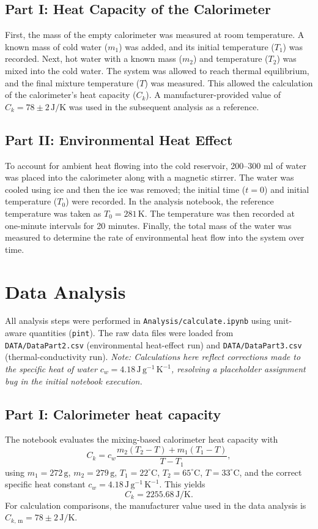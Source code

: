 \documentclass[journal]{IEEEtran}
\begin{document}
\subsection{Part I: Heat Capacity of the Calorimeter}
First, the mass of the empty calorimeter was measured at room temperature. A known mass of cold water ($m_1$) was added, and its initial temperature ($T_1$) was recorded. Next, hot water with a known mass ($m_2$) and temperature ($T_2$) was mixed into the cold water. The system was allowed to reach thermal equilibrium, and the final mixture temperature ($T$) was measured. This allowed the calculation of the calorimeter's heat capacity ($C_k$). A manufacturer-provided value of $C_k = 78 \pm 2\,\text{J/K}$ was used in the subsequent analysis as a reference.

\subsection{Part II: Environmental Heat Effect}
To account for ambient heat flowing into the cold reservoir, 200--300 ml of water was placed into the calorimeter along with a magnetic stirrer. The water was cooled using ice and then the ice was removed; the initial time ($t=0$) and initial temperature ($T_0$) were recorded. In the analysis notebook, the reference temperature was taken as $T_0 = 281\,\text{K}$. The temperature was then recorded at one-minute intervals for 20 minutes. Finally, the total mass of the water was measured to determine the rate of environmental heat flow into the system over time.

\section{Data Analysis}
All analysis steps were performed in \texttt{Analysis/calculate.ipynb} using
unit-aware quantities (\texttt{pint}). The raw data files were loaded from
\texttt{DATA/DataPart2.csv} (environmental heat-effect run) and
\texttt{DATA/DataPart3.csv} (thermal-conductivity run). \textit{Note: Calculations here reflect corrections made to the specific heat of water $c_w = 4.18\,\text{J}\,\text{g}^{-1}\,\text{K}^{-1}$, resolving a placeholder assignment bug in the initial notebook execution.}

\subsection{Part I: Calorimeter heat capacity}
The notebook evaluates the mixing-based calorimeter heat capacity with
\begin{equation}
    C_k = c_w \frac{m_2(T_2 - T) + m_1(T_1 - T)}{T - T_1},
\end{equation}
using $m_1=272\,\text{g}$, $m_2=279\,\text{g}$, $T_1=22^\circ\text{C}$, $T_2=65^\circ\text{C}$,
$T=33^\circ\text{C}$, and the correct specific heat constant
$c_w = 4.18\,\text{J}\,\text{g}^{-1}\,\text{K}^{-1}$. This yields
\begin{equation}
    C_k = 2255.68\,\text{J/K}.
\end{equation}
For calculation comparisons, the manufacturer value used in the data analysis is
$C_{k,\,\text{m}} = 78 \pm 2\,\text{J/K}$.
\end{document}
